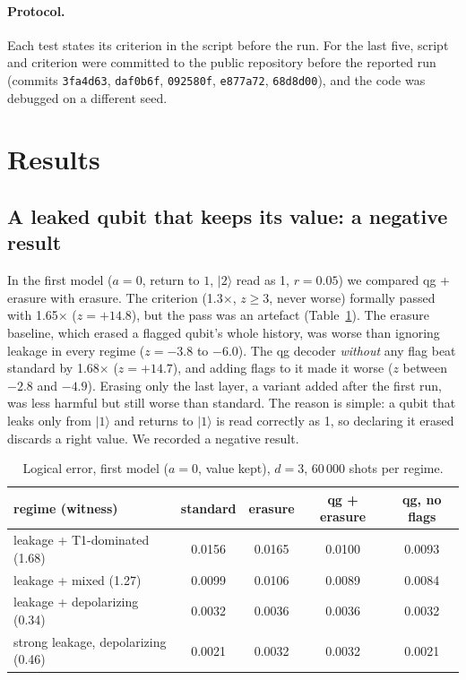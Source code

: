 \documentclass[11pt]{article}
\begin{document}
\paragraph{Protocol.} Each test states its criterion in the script before the run. For the last five,
script and criterion were committed to the public repository before the reported run
(commits \texttt{3fa4d63}, \texttt{daf0b6f}, \texttt{092580f}, \texttt{e877a72}, \texttt{68d8d00}),
and the code was debugged on a different seed.

\section{Results}

\subsection{A leaked qubit that keeps its value: a negative result}

In the first model ($a=0$, return to $1$, $|2\rangle$ read as 1, $r=0.05$) we compared qg + erasure with
erasure. The criterion (1.3$\times$, $z\ge3$, never worse) formally passed with 1.65$\times$
($z=+14.8$), but the pass was an artefact (Table~\ref{tab:neg}). The erasure baseline, which erased a
flagged qubit's whole history, was worse than ignoring leakage in every regime ($z=-3.8$ to $-6.0$).
The qg decoder \emph{without} any flag beat standard by 1.68$\times$ ($z=+14.7$), and adding flags to it
made it worse ($z$ between $-2.8$ and $-4.9$). Erasing only the last layer, a variant added after the
first run, was less harmful but still worse than standard. The reason is simple: a qubit that leaks only
from $|1\rangle$ and returns to $|1\rangle$ is read correctly as 1, so declaring it erased discards a
right value. We recorded a negative result.

\begin{table}[t]
\centering\small
\caption{Logical error, first model ($a=0$, value kept), $d=3$, 60\,000 shots per regime.}
\label{tab:neg}
\begin{tabular}{lcccc}
\toprule
regime (witness) & standard & erasure & qg + erasure & qg, no flags\\
\midrule
leakage + T1-dominated (1.68) & 0.0156 & 0.0165 & 0.0100 & 0.0093\\
leakage + mixed (1.27) & 0.0099 & 0.0106 & 0.0089 & 0.0084\\
leakage + depolarizing (0.34) & 0.0032 & 0.0036 & 0.0036 & 0.0032\\
strong leakage, depolarizing (0.46) & 0.0021 & 0.0032 & 0.0032 & 0.0021\\
\bottomrule
\end{tabular}
\end{table}
\end{document}
